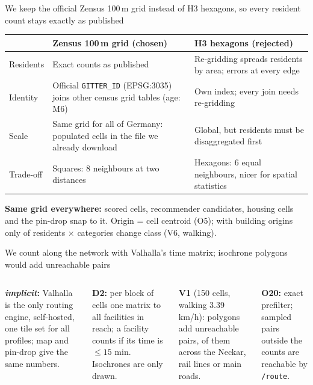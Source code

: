 \documentclass[aspectratio=169,10pt]{beamer}
\newcommand{\impl}{\textit{implicit}}
\begin{document}
\begin{frame}{We keep the official Zensus 100\,m grid instead of H3 hexagons, so every resident
  count stays exactly as published}
  \footnotesize
  \begin{tabular}{@{}P{20mm}P{57mm}P{55mm}@{}}
    \toprule
    & \textbf{Zensus 100\,m grid (chosen)} & H3 hexagons (rejected) \\
    \midrule
    Residents & Exact counts as published & Re-gridding spreads residents by area; errors at
      every edge \\
    Identity & Official \texttt{GITTER\_ID} (EPSG:3035) joins other census grid tables (age:
      M6) & Own index; every join needs re-gridding \\
    Scale & Same grid for all of Germany: \factDeCells{} populated cells in the file we already
      download & Global, but residents must be disaggregated first \\
    Trade-off & Squares: 8 neighbours at two distances & Hexagons: 6 equal neighbours, nicer
      for spatial statistics \\
    \bottomrule
  \end{tabular}
  \par\medskip
  \textbf{Same grid everywhere:} scored cells, recommender candidates, housing cells and the
  pin-drop snap to it. Origin = cell centroid (O5); with building origins only
  \factVSixChange{} of residents $\times$ categories change class (V6, walking).
\end{frame}

\begin{frame}{We count along the network with Valhalla's time matrix; isochrone polygons would
  add \factVOneOvercount{} unreachable pairs}
  \begin{columns}[T,onlytextwidth]
      \centering\isochronetrap
      \footnotesize
      \textbf{\impl:} Valhalla is the only routing engine, self-hosted, one tile set for all
      profiles; map and pin-drop give the same numbers.\par\medskip
      \textbf{D2:} per block of cells one matrix to all facilities in reach; a facility counts
      if its time is $\le 15$ min. Isochrones are only drawn.\par\medskip
      \textbf{V1} (150 cells, walking 3.39\,km/h): polygons add \factVOneOvercount{}
      unreachable pairs, \factVOneBarrier{} of them across the Neckar, rail lines or main
      roads.\par\medskip
      \textbf{O20:} exact prefilter; \factCurFalseNeg{} sampled pairs outside the counts are
      reachable by \texttt{/route}.
  \end{columns}
\end{frame}
\end{document}
